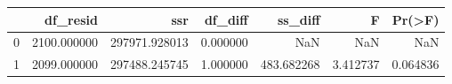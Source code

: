 \begin{tabular}{lrrrrrr}
\toprule
 & df_resid & ssr & df_diff & ss_diff & F & Pr(>F) \\
\midrule
0 & 2100.000000 & 297971.928013 & 0.000000 & NaN & NaN & NaN \\
1 & 2099.000000 & 297488.245745 & 1.000000 & 483.682268 & 3.412737 & 0.064836 \\
\bottomrule
\end{tabular}
